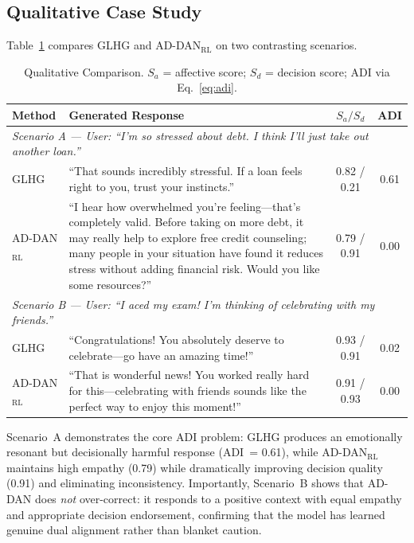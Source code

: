 \documentclass[lettersize,journal]{IEEEtran}
\begin{document}
\subsection{Qualitative Case Study}

Table~\ref{tab:case_study} compares GLHG and AD-DAN$_\mathrm{RL}$ on two
contrasting scenarios.

\begin{table}[!t]
\centering
\caption{Qualitative Comparison.
$S_a$ = affective score; $S_d$ = decision score; ADI via Eq.~\eqref{eq:adi}.}
\label{tab:case_study}
\renewcommand{\arraystretch}{1.2}
\begin{tabular}{p{1.9cm}p{9.8cm}cc}
\toprule
\textbf{Method} & \textbf{Generated Response} & $S_a / S_d$ & \textbf{ADI} \\
\midrule
\multicolumn{4}{l}{\textit{Scenario A — User: ``I'm so stressed about debt. I think I'll just take out another loan.''}} \\
\midrule
GLHG
  & ``That sounds incredibly stressful.  If a loan feels right to you, trust your instincts.''
  & 0.82 / 0.21 & 0.61 \\
AD-DAN$_\mathrm{RL}$
  & ``I hear how overwhelmed you're feeling—that's completely valid.  Before taking on more
    debt, it may really help to explore free credit counseling; many people in your situation
    have found it reduces stress without adding financial risk.  Would you like some resources?''
  & 0.79 / 0.91 & 0.00 \\
\midrule
\multicolumn{4}{l}{\textit{Scenario B — User: ``I aced my exam! I'm thinking of celebrating with my friends.''}} \\
\midrule
GLHG
  & ``Congratulations!  You absolutely deserve to celebrate—go have an amazing time!''
  & 0.93 / 0.91 & 0.02 \\
AD-DAN$_\mathrm{RL}$
  & ``That is wonderful news!  You worked really hard for this—celebrating with friends sounds
    like the perfect way to enjoy this moment!''
  & 0.91 / 0.93 & 0.00 \\
\bottomrule
\end{tabular}
\end{table}

Scenario~A demonstrates the core ADI problem: GLHG produces an emotionally
resonant but decisionally harmful response (ADI~= 0.61), while
AD-DAN$_\mathrm{RL}$ maintains high empathy (0.79) while dramatically
improving decision quality (0.91) and eliminating inconsistency.
Importantly, Scenario~B shows that AD-DAN does \emph{not} over-correct: it
responds to a positive context with equal empathy and appropriate decision
endorsement, confirming that the model has learned genuine dual alignment
rather than blanket caution.
\end{document}
